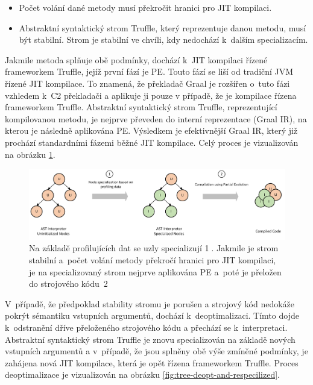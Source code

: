 \documentclass[
  master,
  biblatex,
  figures=true,
  theorems,
  sourcecodes,
  glossaries,
  index
]{kidiplom}
\begin{document}
\begin{itemize}
    \item Počet volání dané metody musí překročit hranici pro JIT kompilaci.
    \item Abstraktní syntaktický strom Truffle, který reprezentuje danou metodu, musí být stabilní. Strom je stabilní ve chvíli, kdy nedochází k~dalším specializacím.  
\end{itemize}

Jakmile metoda splňuje obě podmínky, dochází k~JIT kompilaci řízené frameworkem Truffle, jejíž první fází je PE. Touto fází se liší od tradiční JVM řízené JIT kompilace. To znamená, že překladač Graal je rozšířen o~tuto fázi vzhledem k~C2 překladači a aplikuje ji pouze v případě, že je kompilace řízena frameworkem Truffle. Abstraktní syntaktický strom Truffle, reprezentující kompilovanou metodu, je nejprve převeden do interní reprezentace (Graal IR), na kterou je následně aplikována PE. Výsledkem je efektivnější Graal IR, který již prochází standardními fázemi běžné JIT kompilace. Celý proces je vizualizován na obrázku \ref{fig:tree-specialization-PE}.


\begin{figure} [h]
    \centering
    \includegraphics[width= 1\textwidth]{images/nodes-partial-evaluation.png}
    \caption{Na základě profilujících dat se uzly specializují {\Large \textcircled{\normalsize 1}}. Jakmile je strom stabilní a~počet volání metody překročí hranici pro JIT kompilaci, je na specializovaný strom nejprve aplikována PE a~poté je přeložen do strojového kódu~{\Large \textcircled{\normalsize 2}}~\cite{one-vm-to-rule-them-all}}
    \label{fig:tree-specialization-PE}
\end{figure}



V~případě, že předpoklad stability stromu je porušen a strojový kód nedokáže pokrýt sémantiku vstupních argumentů, dochází k~deoptimalizaci. Tímto dojde k~odstranění dříve přeloženého strojového kódu a přechází se k~interpretaci. Abstraktní syntaktický strom Truffle je znovu specializován na základě nových vstupních argumentů a v~případě, že jsou splněny obě výše zmíněné podmínky, je zahájena nová JIT kompilace, která je opět řízena frameworkem Truffle. Proces deoptimalizace je vizualizován na obrázku \ref{fig:tree-deopt-and-respecilized}.
\end{document}
